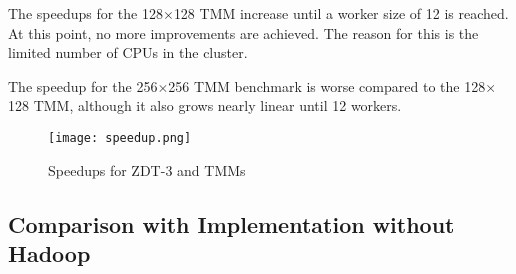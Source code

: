 The speedups for the 128$\times$128 TMM increase until a worker size of 12 is reached. At this point, no more improvements are achieved. The reason for this is the limited number of CPUs in the cluster.

The speedup for the 256$\times$256 TMM benchmark is worse compared to the 128$\times$128 TMM, although it also grows nearly linear until 12 workers.

\begin{figure}
  \centering
  \texttt{[image: speedup.png]}
  \caption[Speedups for ZDT-3 and TMMs]{Speedups for ZDT-3 and TMMs}
  \label{fig:speedup}
\end{figure}

\subsection{Comparison with Implementation without Hadoop}




